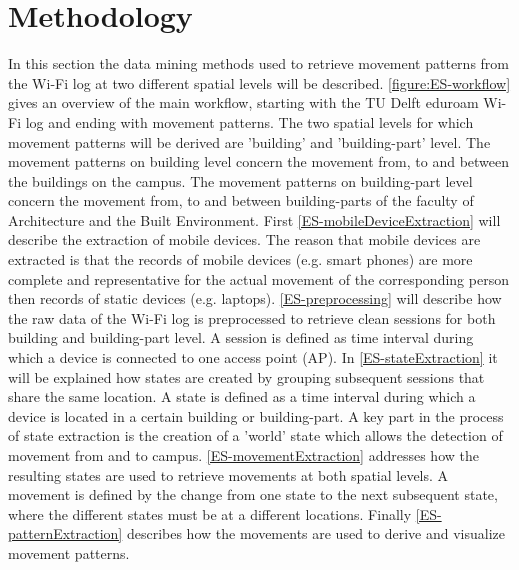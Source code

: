 \section{Methodology}\label{2-methodology}
In this section the data mining methods used to retrieve movement patterns from the Wi-Fi log at two different spatial levels will be described. \autoref{figure:ES-workflow} gives an overview of the main workflow, starting with the TU Delft eduroam Wi-Fi log and ending with movement patterns. The two spatial levels for which movement patterns will be derived are 'building' and 'building-part' level. The movement patterns on building level concern the movement from, to and between the buildings on the campus. The movement patterns on building-part level concern the movement from, to and between building-parts of the faculty of Architecture and the Built Environment. First \autoref{ES-mobileDeviceExtraction} will describe the extraction of mobile devices. The reason that mobile devices are extracted is that the records of mobile devices (e.g. smart phones) are more complete and representative for the actual movement of the corresponding person then records of static devices (e.g. laptops). \autoref{ES-preprocessing} will describe how the raw data of the Wi-Fi log is preprocessed to retrieve clean sessions for both building and building-part level. A session is defined as time interval during which a device is connected to one access point (AP). In \autoref{ES-stateExtraction} it will be explained how states are created by grouping subsequent sessions that share the same location. A state is defined as a time interval during which a device is located in a certain building or building-part. A key part in the process of state extraction is the creation of a 'world' state which allows the detection of movement from and to campus. \autoref{ES-movementExtraction} addresses how the resulting states are used to retrieve movements at both spatial levels. A movement is defined by the change from one state to the next subsequent state, where the different states must be at a different locations. Finally \autoref{ES-patternExtraction} describes how the movements are used to derive and visualize movement patterns.
